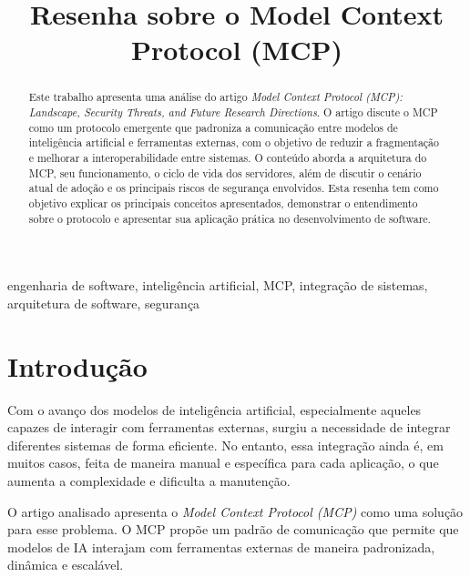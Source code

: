 \documentclass[conference]{IEEEtran}
\begin{document}
\title{Resenha sobre o Model Context Protocol (MCP)}

\author{
}

\maketitle

\begin{abstract}

Este trabalho apresenta uma análise do artigo \textit{Model Context Protocol (MCP): Landscape, Security Threats, and Future Research Directions}. O artigo discute o MCP como um protocolo emergente que padroniza a comunicação entre modelos de inteligência artificial e ferramentas externas, com o objetivo de reduzir a fragmentação e melhorar a interoperabilidade entre sistemas. O conteúdo aborda a arquitetura do MCP, seu funcionamento, o ciclo de vida dos servidores, além de discutir o cenário atual de adoção e os principais riscos de segurança envolvidos. Esta resenha tem como objetivo explicar os principais conceitos apresentados, demonstrar o entendimento sobre o protocolo e apresentar sua aplicação prática no desenvolvimento de software.

\end{abstract}

\begin{IEEEkeywords}
engenharia de software, inteligência artificial, MCP, integração de sistemas, arquitetura de software, segurança
\end{IEEEkeywords}

\section{Introdução}

Com o avanço dos modelos de inteligência artificial, especialmente aqueles capazes de interagir com ferramentas externas, surgiu a necessidade de integrar diferentes sistemas de forma eficiente. No entanto, essa integração ainda é, em muitos casos, feita de maneira manual e específica para cada aplicação, o que aumenta a complexidade e dificulta a manutenção.

O artigo analisado apresenta o \textit{Model Context Protocol (MCP)} como uma solução para esse problema. O MCP propõe um padrão de comunicação que permite que modelos de IA interajam com ferramentas externas de maneira padronizada, dinâmica e escalável.
\end{document}
